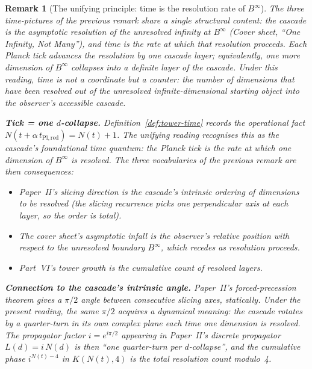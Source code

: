 \documentclass[12pt,a4paper]{article}
\newtheorem*{remark}{Remark}
\begin{document}
\begin{remark}[The unifying principle: time is the resolution rate of $B^\infty$]\label{rem:time-d-collapse}
The three time-pictures of the previous remark share a single structural
content: the cascade is the asymptotic resolution of the unresolved infinity
at $B^\infty$ (Cover sheet, ``One Infinity, Not Many''), and time is the
rate at which that resolution proceeds. Each Planck tick advances the
resolution by one cascade layer; equivalently, one more dimension of
$B^\infty$ collapses into a definite layer of the cascade. Under this
reading, time is not a coordinate but a counter: the number of dimensions
that have been resolved out of the unresolved infinite-dimensional starting
object into the observer's accessible cascade.

\medskip
\noindent\textbf{Tick = one $d$-collapse.} Definition~\ref{def:tower-time}
records the operational fact $N(t+\alpha\,t_{\mathrm{Pl,red}}) = N(t)+1$.
The unifying reading recognises this as the cascade's foundational time
quantum: the Planck tick is the rate at which one dimension of $B^\infty$
is resolved. The three vocabularies of the previous remark are then
consequences:
\begin{itemize}[nosep]
\item Paper~II's slicing direction is the cascade's intrinsic ordering of
dimensions to be resolved (the slicing recurrence picks one perpendicular
axis at each layer, so the order is total).
\item The cover sheet's asymptotic infall is the observer's relative
position with respect to the unresolved boundary $B^\infty$, which recedes
as resolution proceeds.
\item Part~VI's tower growth is the cumulative count of resolved layers.
\end{itemize}

\medskip
\noindent\textbf{Connection to the cascade's intrinsic angle.} Paper~II's
forced-precession theorem gives a $\pi/2$ angle between consecutive
slicing axes, statically. Under the present reading, the same $\pi/2$
acquires a dynamical meaning: the cascade rotates by a quarter-turn in
its own complex plane each time one dimension is resolved. The propagator
factor $i = e^{i\pi/2}$ appearing in Paper~II's discrete propagator
$L(d) = i\,N(d)$ is then ``one quarter-turn per $d$-collapse'', and the
cumulative phase $i^{N(t)-4}$ in $K(N(t), 4)$ is the total resolution
count modulo~4.


\end{remark}
\end{document}
